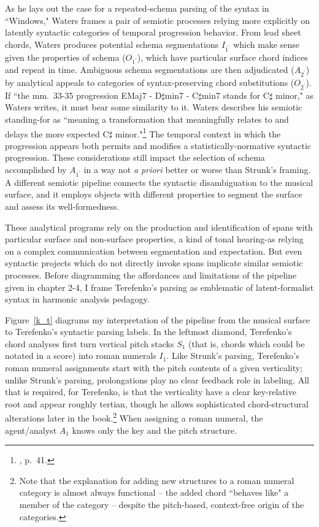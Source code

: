 As he lays out the case for a repeated-schema parsing of the syntax in ``Windows," Waters frames a pair of semiotic processes relying more explicitly on latently syntactic categories of temporal progression behavior.  From lead sheet chords, Waters produces potential schema segmentations $I_{1^{\prime}}$ which make sense given the properties of schema ($O_{1^{\prime}}$), which have particular surface chord indices and repeat in time.  Ambiguous schema segmentations are then adjudicated ($A_{2^{\prime}}$) by analytical appeals to categories of syntax-preserving chord substitutions ($O_{2^{\prime}}$).  If ``the mm.\ 33-35 progression EMaj7 - D$\sharp$min7 - C$\sharp$min7 stands for C$\sharp$ minor," as Waters writes, it must bear some similarity to it. Waters describes his semiotic standing-for as ``meaning a transformation that meaningfully relates to and delays the more expected C$\sharp$ minor."\footnote{\cite{waters2016}, p.\ 41.}  The temporal context in which the progression appears both permits and modifies a statistically-normative syntactic progression.  These considerations still impact the selection of schema accomplished by $A_{1^{\prime}}$ in a way not \emph{a priori} better or worse than Strunk's framing.  A different semiotic pipeline connects the syntactic disambiguation to the musical surface, and it employs objects with different properties to segment the surface and assess its well-formedness.

These analytical programs rely on the production and identification of spans with particular surface and non-surface properties, a kind of tonal hearing-as relying on a complex communication between segmentation and expectation.  But even syntactic projects which do not directly invoke spans implicate similar semiotic processes.  Before diagramming the affordances and limitations of the pipeline given in chapter 2-4, I frame Terefenko's parsing as emblematic of latent-formalist syntax in harmonic analysis pedagogy.

Figure~\ref{k_t} diagrams my interpretation of the pipeline from the musical surface to Terefenko's syntactic parsing labels.  In the leftmost diamond, Terefenko's chord analyses first turn vertical pitch stacks $S_1$ (that is, chords which could be notated in a score) into roman numerals $I_1$.  Like Strunk's parsing, Terefenko's roman numeral assignments start with the pitch contents of a given verticality; unlike Strunk's parsing, prolongations play no clear feedback role in labeling.  All that is required, for Terefenko, is that the verticality have a clear key-relative root and appear roughly tertian, though he allows sophisticated chord-structural alterations later in the book.\footnote{Note that the explanation for adding new structures to a roman numeral category is almost always functional -- the added chord ``behaves like" a member of the category -- despite the pitch-based, context-free origin of the categories.}  When assigning a roman numeral, the agent/analyst $A_1$ knows only the key and the pitch structure.

